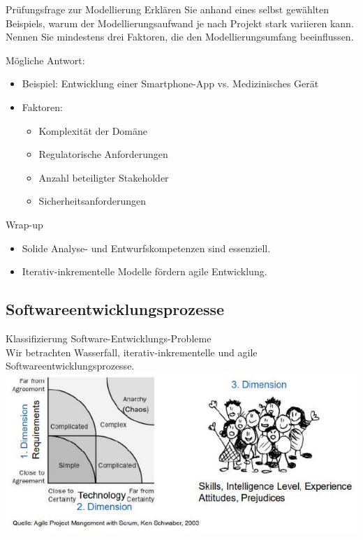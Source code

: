 \begin{example2}{Prüfungsfrage zur Modellierung}
Erklären Sie anhand eines selbst gewählten Beispiels, warum der Modellierungsaufwand je nach Projekt stark variieren kann. Nennen Sie mindestens drei Faktoren, die den Modellierungsumfang beeinflussen.

Mögliche Antwort:
\begin{itemize}
    \item Beispiel: Entwicklung einer Smartphone-App vs. Medizinisches Gerät
    \item Faktoren:
    \begin{itemize}
        \item Komplexität der Domäne
        \item Regulatorische Anforderungen
        \item Anzahl beteiligter Stakeholder
        \item Sicherheitsanforderungen
    \end{itemize}
\end{itemize}
\end{example2}

\begin{concept}{Wrap-up}
\begin{itemize}
    \item Solide Analyse- und Entwurfskompetenzen sind essenziell.
    \item Iterativ-inkrementelle Modelle fördern agile Entwicklung.
\end{itemize}
\end{concept}

\subsection{Softwareentwicklungsprozesse}

\begin{concept}{Klassifizierung Software-Entwicklungs-Probleme}\\
  Wir betrachten Wasserfall, iterativ-inkrementelle und agile Softwareentwicklungsprozesse.\\
  \includegraphics[width=\linewidth]{images/2024_12_29_0d1d7b5551ea1b4b41bdg-01}
\end{concept}


